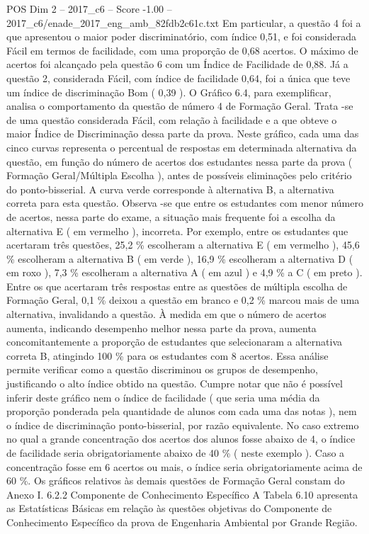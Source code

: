 \begin{textsample}{POS Dim 2 – 2017\_c6 – Score -1.00 – 2017\_c6/enade\_2017\_eng\_amb\_82fdb2c61c.txt}
Em particular, a questão 4 foi a que apresentou o maior poder discriminatório, com índice 0,51, e foi considerada Fácil em termos de facilidade, com uma proporção de 0,68 acertos.
O máximo de acertos foi alcançado pela questão 6 com um Índice de Facilidade de 0,88.
Já a questão 2, considerada Fácil, com índice de facilidade 0,64, foi a única que teve um índice de discriminação Bom ( 0,39 ).
O Gráfico 6.4, para exemplificar, analisa o comportamento da questão de número 4 de Formação Geral.
Trata -se de uma questão considerada Fácil, com relação à facilidade e a que obteve o maior Índice de Discriminação dessa parte da prova.
Neste gráfico, cada uma das cinco curvas representa o percentual de respostas em determinada alternativa da questão, em função do número de acertos dos estudantes nessa parte da prova ( Formação Geral/Múltipla Escolha ), antes de possíveis eliminações pelo critério do ponto-bisserial.
A curva verde corresponde à alternativa B, a alternativa correta para esta questão.
Observa -se que entre os estudantes com menor número de acertos, nessa parte do exame, a situação mais frequente foi a escolha da alternativa E ( em vermelho ), incorreta.
Por exemplo, entre os estudantes que acertaram três questões, 25,2 \% escolheram a alternativa E ( em vermelho ), 45,6 \% escolheram a alternativa B ( em verde ), 16,9 \% escolheram a alternativa D ( em roxo ), 7,3 \% escolheram a alternativa A ( em azul ) e 4,9 \% a C ( em preto ).
Entre os que acertaram três respostas entre as questões de múltipla escolha de Formação Geral, 0,1 \% deixou a questão em branco e 0,2 \% marcou mais de uma alternativa, invalidando a questão.
À medida em que o número de acertos aumenta, indicando desempenho melhor nessa parte da prova, aumenta concomitantemente a proporção de estudantes que selecionaram a alternativa correta B, atingindo 100 \% para os estudantes com 8 acertos.
Essa análise permite verificar como a questão discriminou os grupos de desempenho, justificando o alto índice obtido na questão.
Cumpre notar que não é possível inferir deste gráfico nem o índice de facilidade ( que seria uma média da proporção ponderada pela quantidade de alunos com cada uma das notas ), nem o índice de discriminação ponto-bisserial, por razão equivalente.
No caso extremo no qual a grande concentração dos acertos dos alunos fosse abaixo de 4, o índice de facilidade seria obrigatoriamente abaixo de 40 \% ( neste exemplo ).
Caso a concentração fosse em 6 acertos ou mais, o índice seria obrigatoriamente acima de 60 \%.
Os gráficos relativos às demais questões de Formação Geral constam do Anexo I. 6.2.2 Componente de Conhecimento Específico A Tabela 6.10 apresenta as Estatísticas Básicas em relação às questões objetivas do Componente de Conhecimento Específico da prova de Engenharia Ambiental por Grande Região.

\end{textsample}
